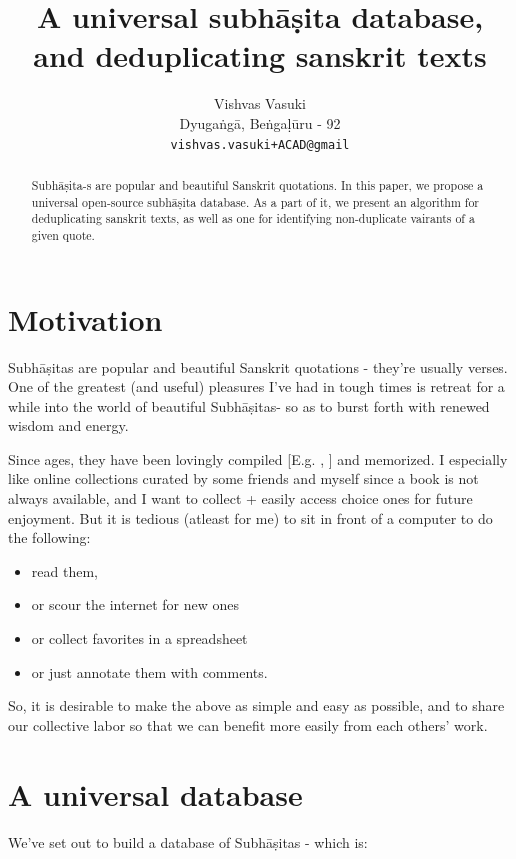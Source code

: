 \documentclass[11pt]{article}
\title{A universal subhāṣita database, and deduplicating sanskrit texts}
\author{Vishvas Vasuki \\
  Dyugaṅgā, Beṅgaḷūru - 92 \\
  {\tt vishvas.vasuki+ACAD@gmail}
\\}
\date{}
\begin{document}
\maketitle
\begin{abstract}
Subhāṣita-s are popular and beautiful Sanskrit quotations. In this paper, we propose a universal open-source subhāṣita database. As a part of it, we present an algorithm for deduplicating sanskrit texts, as well as one for identifying non-duplicate vairants of a given quote.
\end{abstract}

\section{Motivation}
Subhāṣitas are popular and beautiful Sanskrit quotations - they're usually verses. One of the greatest (and useful) pleasures I've had in tough times is retreat for a while into the world of beautiful Subhāṣitas- so as to burst forth with renewed wisdom and energy. 

Since ages, they have been lovingly compiled [E.g. \cite{subhashita-1952}, \cite{mss-1974}] and memorized. I especially like online collections curated by some friends and myself since a book is not always available, and I want to collect + easily access choice ones for future enjoyment. But it is tedious (atleast for me) to sit in front of a computer to do the following:

\begin{itemize}
\tightlist
\item
  read them,
\item
  or scour the internet for new ones
\item
  or collect favorites in a spreadsheet
\item
  or just annotate them with comments.
\end{itemize}

So, it is desirable to make the above as simple and easy as possible, and to share our collective labor so that we can benefit more easily from each others' work.

\section{A universal database}

We've set out to build a database of Subhāṣitas - which is:
\end{document}
